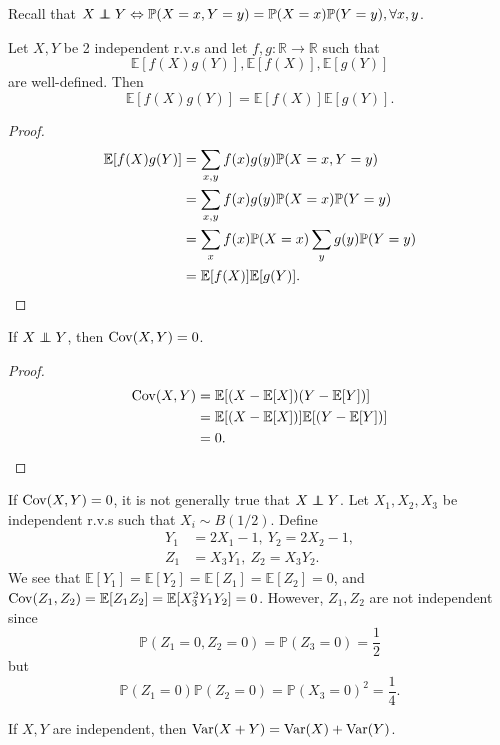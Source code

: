 Recall that $ X\independent Y \Leftrightarrow \mathbb{P}(X=x,Y=y)=\mathbb{P}(X=x)\mathbb{P}(Y=y), \forall x,y $.

\begin{proposition}
    Let $X,Y$ be 2 independent r.v.s and let $ f,g:\mathbb{R} \to \mathbb{R} $ such that
    \[
        \mathbb{E}[f(X)g(Y)],\mathbb{E}[f(X)],\mathbb{E}[g(Y)]
    \]
    are well-defined. Then
    \[
        \mathbb{E}[f(X)g(Y)] = \mathbb{E}[f(X)]\mathbb{E}[g(Y)].
    \]
\end{proposition}
\begin{proof}
    \begin{align*}
        \mathbb{E}[f(X)g(Y)]&= \sum_{x,y} f(x)g(y) \mathbb{P}(X=x,Y=y)\\ 
        &= \sum_{x,y} f(x)g(y) \mathbb{P}(X=x)\mathbb{P}(Y=y)\\ 
        &= \sum_{x} f(x)\mathbb{P}(X=x) \sum_y g(y)\mathbb{P}(Y=y)\\ 
        &= \mathbb{E}[f(X)]\mathbb{E}[g(Y)].\qedhere
    \end{align*}
\end{proof}

\begin{proposition}
    If $ X \independent Y $, then $ \operatorname{Cov}(X,Y)=0 $.
\end{proposition}
\begin{proof}
    \begin{align*}
        \operatorname{Cov}(X,Y) &= \mathbb{E}[(X-\mathbb{E}[X])(Y-\mathbb{E}[Y])] \\
        &= \mathbb{E}[(X-\mathbb{E}[X])]\mathbb{E}[(Y-\mathbb{E}[Y])]\\ 
        &= 0.\qedhere
    \end{align*}
\end{proof}
\begin{note}
    If $ \operatorname{Cov}(X,Y)=0 $, it is not generally true that $ X \independent Y $. Let $ X_1,X_2,X_3 $ be independent r.v.s such that $ X_i\sim B(1/2) $. Define 
    \[
        \begin{aligned}
            Y_1 &= 2X_1-1,\  Y_2 = 2X_2-1,\\ 
            Z_1&=X_3Y_1,\ Z_2 =X_3Y_2.
        \end{aligned}
    \]
    We see that $ \mathbb{E}[Y_1]=\mathbb{E}[Y_2]=\mathbb{E}[Z_1]=\mathbb{E}[Z_2]=0 $, and $ \operatorname{Cov}(Z_1,Z_2) = \mathbb{E}[Z_1Z_2] = \mathbb{E}[X_3^2Y_1Y_2]=0 $. However, $ Z_1,Z_2 $ are not independent since 
    \[
        \mathbb{P}(Z_1=0,Z_2=0) = \mathbb{P}(Z_3=0) = \frac{1}{2}
    \]
    but 
    \[
        \mathbb{P}(Z_1=0)\mathbb{P}(Z_2=0) = \mathbb{P}(X_3=0)^2=\frac{1}{4}.
    \]
\end{note}
\begin{corollary}
    If $ X,Y $ are independent, then $ \operatorname{Var}(X+Y) = \operatorname{Var}(X)+\operatorname{Var}(Y) $.
\end{corollary}

